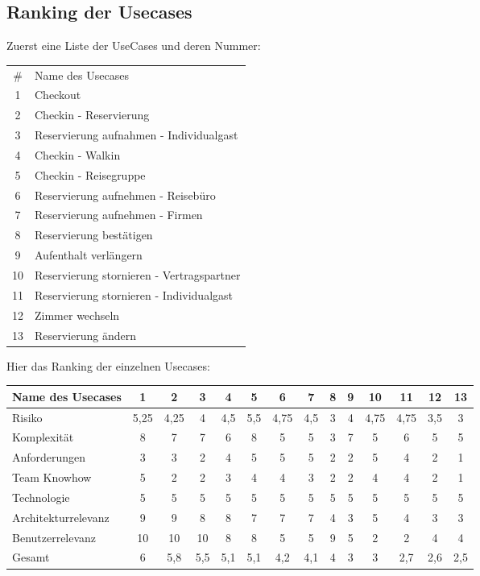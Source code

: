 \subsection{Ranking der Usecases}
Zuerst eine Liste der UseCases und deren Nummer:
\newline \newline
\begin{tabular} { |c | l |}
	\hline
	\# & Name des Usecases \\
	1 & Checkout\\
	2 & Checkin - Reservierung\\
	3 & Reservierung aufnahmen - Individualgast\\
	4 & Checkin - Walkin\\
	5 & Checkin - Reisegruppe\\
	6 & Reservierung aufnehmen - Reisebüro\\
	7 & Reservierung aufnehmen - Firmen\\
	8 & Reservierung bestätigen\\
	9 & Aufenthalt verlängern\\
	10 & Reservierung stornieren - Vertragspartner\\
	11 & Reservierung stornieren - Individualgast\\
	12 & Zimmer wechseln\\
	13 & Reservierung ändern\\
	\hline
\end{tabular}

\vspace{1cm}

Hier das Ranking der einzelnen Usecases:
\vspace{1cm}

\begin{tabular} { | l | c c c c c c c c c c c c c | }
	\hline
	Name des Usecases & 1 & 2 & 3 & 4 & 5 & 6 & 7 & 8 & 9 & 10 & 11 & 12 & 13 \\ \hline
	Risiko & 5,25 &	4,25 & 4 & 4,5 & 5,5 & 4,75 & 4,5 & 3 & 4 & 4,75 & 4,75 & 3,5 & 3\\
	Komplexität & 8 & 7 & 7 & 6 & 8 & 5 & 5 & 3 & 7 & 5 & 6 & 5 & 5\\
	Anforderungen & 3 & 3 & 2 & 4 & 5 & 5 & 5 & 2 & 2 & 5 & 4 & 2 & 1\\
	Team Knowhow & 5 & 2 & 2 & 3 & 4 & 4 & 3 & 2 & 2 & 4 & 4 & 2 & 1\\
	Technologie & 5 & 5 & 5 & 5 & 5 & 5 & 5 & 5  & 5 & 5 & 5 & 5 & 5\\
	\hline
	Architekturrelevanz	& 9 & 9 & 8 & 8 & 7 & 7 & 7 & 4 & 3 & 5 & 4 & 3 & 3\\
	Benutzerrelevanz & 10 & 10 & 10 & 8 & 8 & 5 & 5 & 9 & 5 & 2 & 2 & 4 & 4 \\
	\hline \hline
	Gesamt & 6 & 5,8 & 5,5 & 5,1 & 5,1 & 4,2 & 4,1 & 4 & 3 & 3 & 2,7 & 2,6 & 2,5\\
\hline
\end{tabular}



